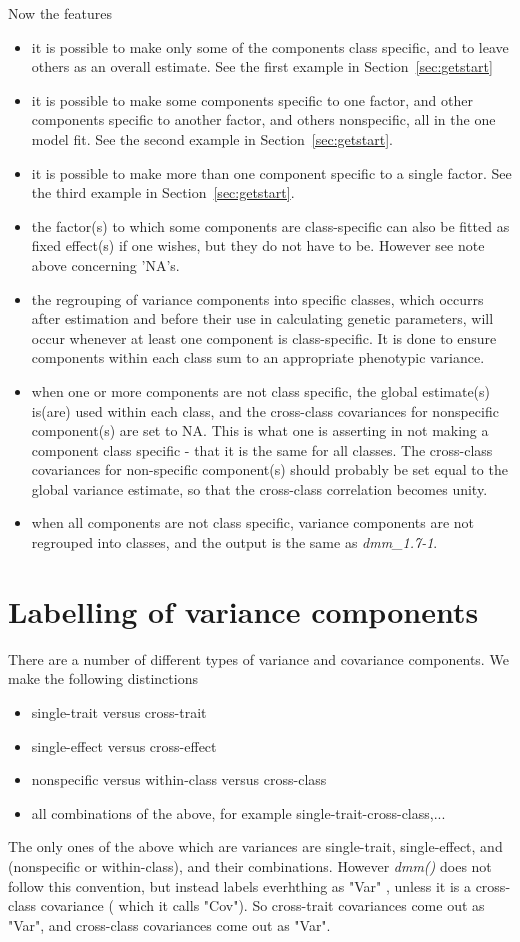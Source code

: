 \documentclass[titlepage]{article}  %
\begin{document}
Now the features
\begin{itemize}
\item  it is possible to make only some of the components class specific, and to leave others as an overall estimate. See the first example in Section~\ref{sec:getstart}
\item  it is possible to make some components specific to one factor, and other components specific to another factor, and others nonspecific, all in the one model fit. See the second example in Section~\ref{sec:getstart}.
\item it is possible to make more than one component specific to a single factor. See the third example in Section~\ref{sec:getstart}.
\item  the factor(s) to which some components are class-specific can also be fitted as fixed effect(s) if one wishes, but they do not have to be. However see note above concerning 'NA's.
\item the regrouping of variance components into specific classes, which occurrs after estimation and before their use in calculating genetic parameters, will occur whenever at least one component is class-specific. It is done to ensure components within each class sum to an appropriate phenotypic variance. 
\item when one or more components are not class specific, the global estimate(s) is(are) used within each class, and the cross-class covariances for nonspecific component(s) are set to NA. This is what one is asserting in not making a component class specific - that it is the same for all classes. The cross-class covariances for non-specific component(s) should probably be set equal to the global variance estimate, so that the cross-class correlation becomes unity.
\item when all components are not class specific, variance components are not regrouped into classes, and the output is the same as {\em dmm\_1.7-1}.
\end{itemize}

\section{Labelling of variance components}
	There are a number  of different types of variance and covariance components. We make the following distinctions
\begin{itemize}
\item single-trait versus cross-trait
\item single-effect versus cross-effect
\item nonspecific versus within-class versus cross-class
\item all combinations of the above, for example single-trait-cross-class,...
\end{itemize}
The only ones of the above which are variances are single-trait, single-effect, and (nonspecific or within-class), and their combinations. However {\em dmm()} does not follow this convention, but instead labels everhthing as "Var" , unless it is a cross-class covariance ( which it calls "Cov"). So cross-trait covariances come out as "Var", and cross-class covariances come out as "Var".
\end{document}
